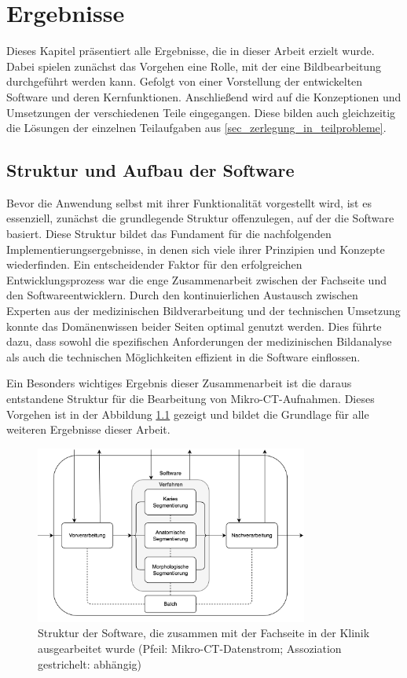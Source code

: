 \chapter{Ergebnisse}
\label{chap:ergebnisse} Dieses Kapitel präsentiert alle Ergebnisse, die in
dieser Arbeit erzielt wurde. Dabei spielen zunächst das Vorgehen eine Rolle, mit
der eine Bildbearbeitung durchgeführt werden kann. Gefolgt von einer Vorstellung
der entwickelten Software und deren Kernfunktionen. Anschließend wird auf die
Konzeptionen und Umsetzungen der verschiedenen Teile eingegangen. Diese bilden auch
gleichzeitig die Lösungen der einzelnen Teilaufgaben aus \ref{sec_zerlegung_in_teilprobleme}.

\section{Struktur und Aufbau der Software}
\label{sec:struktur_der_software} Bevor die Anwendung selbst mit ihrer Funktionalität
vorgestellt wird, ist es essenziell, zunächst die grundlegende Struktur offenzulegen,
auf der die Software basiert. Diese Struktur bildet das Fundament für die nachfolgenden
Implementierungsergebnisse, in denen sich viele ihrer Prinzipien und Konzepte
wiederfinden. Ein entscheidender Faktor für den erfolgreichen Entwicklungsprozess
war die enge Zusammenarbeit zwischen der Fachseite und den Softwareentwicklern.
Durch den kontinuierlichen Austausch zwischen Experten aus der medizinischen
Bildverarbeitung und der technischen Umsetzung konnte das Domänenwissen beider
Seiten optimal genutzt werden. Dies führte dazu, dass sowohl die spezifischen
Anforderungen der medizinischen Bildanalyse als auch die technischen
Möglichkeiten effizient in die Software einflossen.

Ein Besonders wichtiges Ergebnis dieser Zusammenarbeit ist die daraus
entstandene Struktur für die Bearbeitung von Mikro-\ac{CT}-Aufnahmen. Dieses Vorgehen
ist in der Abbildung \ref{fig:struktur_der_software} gezeigt und bildet die Grundlage
für alle weiteren Ergebnisse dieser Arbeit.

\begin{figure}[h]
	\centering
	\includegraphics[width=0.8\textwidth]{img/struktur_der_software.png}
	\caption{Struktur der Software, die zusammen mit der Fachseite in der Klinik ausgearbeitet
	wurde (Pfeil: Mikro-CT-Datenstrom; Assoziation gestrichelt: abhängig)}
	\label{fig:struktur_der_software}
\end{figure}

